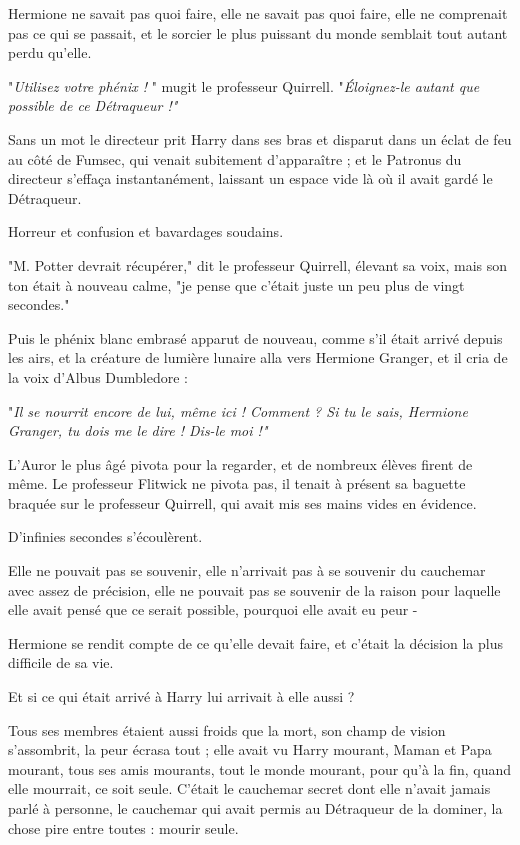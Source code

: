 Hermione ne savait pas quoi faire, elle ne savait pas quoi faire, elle ne comprenait pas ce qui se passait, et le sorcier le plus puissant du monde semblait tout autant perdu qu'elle.

"\emph{Utilisez votre phénix !} " mugit le professeur Quirrell. "\emph{Éloignez-le autant que possible de ce Détraqueur !"} 

Sans un mot le directeur prit Harry dans ses bras et disparut dans un éclat de feu au côté de Fumsec, qui venait subitement d'apparaître ; et le Patronus du directeur s'effaça instantanément, laissant un espace vide là où il avait gardé le Détraqueur.

Horreur et confusion et bavardages soudains.

"M. Potter devrait récupérer," dit le professeur Quirrell, élevant sa voix, mais son ton était à nouveau calme, "je pense que c'était juste un peu plus de vingt secondes."

Puis le phénix blanc embrasé apparut de nouveau, comme s'il était arrivé depuis les airs, et la créature de lumière lunaire alla vers Hermione Granger, et il cria de la voix d'Albus Dumbledore :

"\emph{Il se nourrit encore de lui, même ici ! Comment ? Si tu le sais, Hermione Granger, tu dois me le dire ! Dis-le moi !"} 

L'Auror le plus âgé pivota pour la regarder, et de nombreux élèves firent de même. Le professeur Flitwick ne pivota pas, il tenait à présent sa baguette braquée sur le professeur Quirrell, qui avait mis ses mains vides en évidence.

D'infinies secondes s'écoulèrent.

Elle ne pouvait pas se souvenir, elle n'arrivait pas à se souvenir du cauchemar avec assez de précision, elle ne pouvait pas se souvenir de la raison pour laquelle elle avait pensé que ce serait possible, pourquoi elle avait eu peur -

Hermione se rendit compte de ce qu'elle devait faire, et c'était la décision la plus difficile de sa vie.

Et si ce qui était arrivé à Harry lui arrivait à elle aussi ?

Tous ses membres étaient aussi froids que la mort, son champ de vision s'assombrit, la peur écrasa tout ; elle avait vu Harry mourant, Maman et Papa mourant, tous ses amis mourants, tout le monde mourant, pour qu'à la fin, quand elle mourrait, ce soit seule. C'était le cauchemar secret dont elle n'avait jamais parlé à personne, le cauchemar qui avait permis au Détraqueur de la dominer, la chose pire entre toutes : mourir seule.

